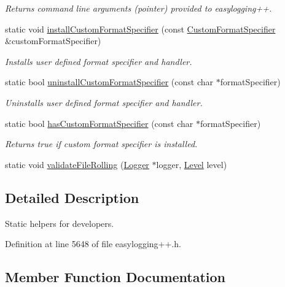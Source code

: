 \begin{DoxyCompactItemize}
\begin{DoxyCompactList}\small\item\em Returns command line arguments (pointer) provided to easylogging++. \end{DoxyCompactList}\item 
static void \hyperlink{classel_1_1_helpers_aa6de15a09db4f2a6763a6652c0ea12b1}{install\+Custom\+Format\+Specifier} (const \hyperlink{classel_1_1_custom_format_specifier}{Custom\+Format\+Specifier} \&custom\+Format\+Specifier)
\begin{DoxyCompactList}\small\item\em Installs user defined format specifier and handler. \end{DoxyCompactList}\item 
static bool \hyperlink{classel_1_1_helpers_a23ec73819c25758d604d149ad0c6b73f}{uninstall\+Custom\+Format\+Specifier} (const char $\ast$format\+Specifier)
\begin{DoxyCompactList}\small\item\em Uninstalls user defined format specifier and handler. \end{DoxyCompactList}\item 
static bool \hyperlink{classel_1_1_helpers_a154ce041890564d1ae5f87184e24f13d}{has\+Custom\+Format\+Specifier} (const char $\ast$format\+Specifier)
\begin{DoxyCompactList}\small\item\em Returns true if custom format specifier is installed. \end{DoxyCompactList}\item 
static void \hyperlink{classel_1_1_helpers_aea3fcde8a07e6f7278574e9563d8ab6b}{validate\+File\+Rolling} (\hyperlink{classel_1_1_logger}{Logger} $\ast$logger, \hyperlink{namespaceel_ab0ac6091262344c52dd2d3ad099e8e36}{Level} level)
\end{DoxyCompactItemize}


\subsection{Detailed Description}
Static helpers for developers. 

Definition at line 5648 of file easylogging++.\+h.



\subsection{Member Function Documentation}
\hypertarget{classel_1_1_helpers_a83bab44f77a4961f8f5231e7ce9917bb}{}
